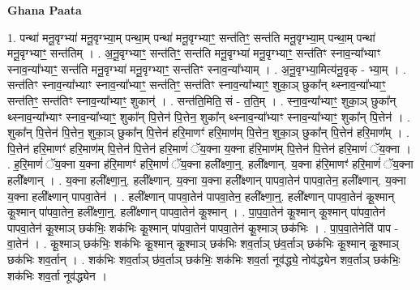 \documentclass[17pt]{extarticle}
\begin{document}
\textbf{Ghana Paata } \newline

1. पन्था॑ मनू॒वृग्भ्या॑ मनू॒वृग्भ्या॒म् पन्था॒म् पन्था॑ मनू॒वृग्भ्याꣳ॒॒ सन्त॑तिꣳ॒॒ सन्त॑ति मनू॒वृग्भ्या॒म् पन्था॒म् पन्था॑ मनू॒वृग्भ्याꣳ॒॒ सन्त॑तिम् । . अ॒नू॒वृग्भ्याꣳ॒॒ सन्त॑तिꣳ॒॒ सन्त॑ति मनू॒वृग्भ्या॑ मनू॒वृग्भ्याꣳ॒॒ सन्त॑तिꣳ स्नाव॒न्या᳚भ्याꣳ स्नाव॒न्या᳚भ्याꣳ॒॒ सन्त॑ति मनू॒वृग्भ्या॑ मनू॒वृग्भ्याꣳ॒॒ सन्त॑तिꣳ स्नाव॒न्या᳚भ्याम् । . अ॒नू॒वृग्भ्या॒मित्य॑नू॒वृक् - भ्या॒म् । . सन्त॑तिꣳ स्नाव॒न्या᳚भ्याꣳ स्नाव॒न्या᳚भ्याꣳ॒॒ सन्त॑तिꣳ॒॒ सन्त॑तिꣳ स्नाव॒न्या᳚भ्याꣳ॒॒ शुका॒ञ् 
छुका᳚न् थ्स्नाव॒न्या᳚भ्याꣳ॒॒ सन्त॑तिꣳ॒॒ सन्त॑तिꣳ स्नाव॒न्या᳚भ्याꣳ॒॒ शुकान्॑ । . सन्त॑ति॒मिति॒ सं - त॒ति॒म् । . स्ना॒व॒न्या᳚भ्याꣳ॒॒ शुका॒ञ् छुका᳚न् थ्स्नाव॒न्या᳚भ्याꣳ स्नाव॒न्या᳚भ्याꣳ॒॒ शुका᳚न् पि॒त्तेन॑ पि॒त्तेन॒ शुका᳚न् थ्स्नाव॒न्या᳚भ्याꣳ स्नाव॒न्या᳚भ्याꣳ॒॒ शुका᳚न् पि॒त्तेन॑ । . शुका᳚न् पि॒त्तेन॑ पि॒त्तेन॒ शुका॒ञ् छुका᳚न् पि॒त्तेन॑ हरि॒माणꣳ॑ हरि॒माण॑म् पि॒त्तेन॒ शुका॒ञ् छुका᳚न् पि॒त्तेन॑ हरि॒माण᳚म् । . पि॒त्तेन॑ हरि॒माणꣳ॑ हरि॒माण॑म् पि॒त्तेन॑ पि॒त्तेन॑ हरि॒माणं॑ ॅय॒क्ना य॒क्ना ह॑रि॒माण॑म् पि॒त्तेन॑ पि॒त्तेन॑ हरि॒माणं॑ ॅय॒क्ना । . ह॒रि॒माणं॑ ॅय॒क्ना य॒क्ना ह॑रि॒माणꣳ॑ हरि॒माणं॑ ॅय॒क्ना हली᳚क्ष्णा॒न्॒. हली᳚क्ष्णान्. य॒क्ना ह॑रि॒माणꣳ॑ हरि॒माणं॑ ॅय॒क्ना हली᳚क्ष्णान् । . य॒क्ना हली᳚क्ष्णा॒न्॒. हली᳚क्ष्णान्. य॒क्ना य॒क्ना हली᳚क्ष्णान् पापवा॒तेन॑ पापवा॒तेन॒ हली᳚क्ष्णान्. य॒क्ना य॒क्ना हली᳚क्ष्णान् पापवा॒तेन॑ । . हली᳚क्ष्णान् पापवा॒तेन॑ पापवा॒तेन॒ हली᳚क्ष्णा॒न्॒. हली᳚क्ष्णान् पापवा॒तेन॑ कू॒श्मान् कू॒श्मान् पा॑पवा॒तेन॒ हली᳚क्ष्णा॒न्॒. हली᳚क्ष्णान् पापवा॒तेन॑ कू॒श्मान् । . पा॒प॒वा॒तेन॑ कू॒श्मान् कू॒श्मान् पा॑पवा॒तेन॑ पापवा॒तेन॑ कू॒श्माञ् छक॑भिः॒ शक॑भिः कू॒श्मान् पा॑पवा॒तेन॑ पापवा॒तेन॑ कू॒श्माञ् छक॑भिः । . पा॒प॒वा॒तेनेति॑ पाप - वा॒तेन॑ । . कू॒श्माञ् छक॑भिः॒ शक॑भिः कू॒श्मान् कू॒श्माञ् छक॑भिः शव॒र्ताञ् छ॑व॒र्ताञ् छक॑भिः कू॒श्मान् कू॒श्माञ् छक॑भिः शव॒र्तान् । . शक॑भिः शव॒र्ताञ् छ॑व॒र्ताञ् छक॑भिः॒ शक॑भिः शव॒र्ता नूव॑द्ध्ये॒ नोव॑द्ध्येन शव॒र्ताञ् छक॑भिः॒ शक॑भिः शव॒र्ता नूव॑द्ध्येन । \newline
\end{document}
